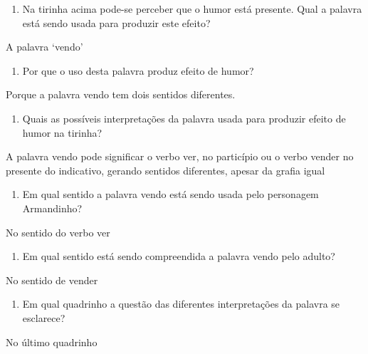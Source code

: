 \begin{enumerate}
\def\labelenumi{\arabic{enumi})}
\tightlist
\item
  Na tirinha acima pode-se perceber que o humor está presente. Qual a
  palavra está sendo usada para produzir este efeito?
\end{enumerate}

A palavra `vendo'

\begin{enumerate}
\def\labelenumi{\arabic{enumi})}
\setcounter{enumi}{1}
\tightlist
\item
  Por que o uso desta palavra produz efeito de humor?
\end{enumerate}

Porque a palavra vendo tem dois sentidos diferentes.

\begin{enumerate}
\def\labelenumi{\arabic{enumi})}
\setcounter{enumi}{2}
\tightlist
\item
  Quais as possíveis interpretações da palavra usada para produzir
  efeito de humor na tirinha?
\end{enumerate}

A palavra vendo pode significar o verbo ver, no particípio ou o verbo
vender no presente do indicativo, gerando sentidos diferentes, apesar da
grafia igual

\begin{enumerate}
\def\labelenumi{\arabic{enumi})}
\setcounter{enumi}{3}
\tightlist
\item
  Em qual sentido a palavra vendo está sendo usada pelo personagem
  Armandinho?
\end{enumerate}

No sentido do verbo ver

\begin{enumerate}
\def\labelenumi{\arabic{enumi})}
\setcounter{enumi}{4}
\tightlist
\item
  Em qual sentido está sendo compreendida a palavra vendo pelo adulto?
\end{enumerate}

No sentido de vender

\begin{enumerate}
\def\labelenumi{\arabic{enumi})}
\setcounter{enumi}{5}
\tightlist
\item
  Em qual quadrinho a questão das diferentes interpretações da palavra
  se esclarece?
\end{enumerate}

No último quadrinho

